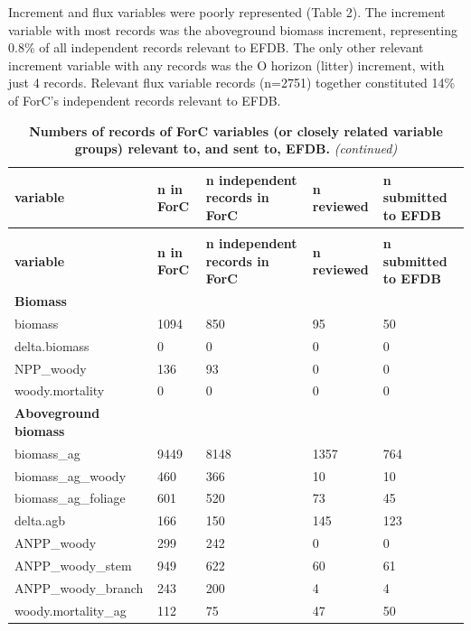 \documentclass[, manuscript]{copernicus}
\begin{document}
Increment and flux variables were poorly represented (Table 2). The
increment variable with most records was the aboveground biomass
increment, representing 0.8\% of all independent records relevant to
EFDB. The only other relevant increment variable with any records was
the O horizon (litter) increment, with just 4 records. Relevant flux
variable records (n=2751) together constituted 14\% of ForC's
independent records relevant to EFDB.

\newpage
\begingroup\fontsize{8}{10}\selectfont

\begin{longtable}[t]{l|l|l|l|l}
\caption{\label{tab:table_variables}\textbf{Numbers of records of ForC variables (or closely related variable groups) relevant to, and sent to, EFDB.}}\\
\hline
\textbf{variable} & \textbf{n in ForC} & \textbf{n independent records in ForC} & \textbf{n reviewed} & \textbf{n submitted to EFDB}\\
\hline
\endfirsthead
\caption[]{\textbf{Numbers of records of ForC variables (or closely related variable groups) relevant to, and sent to, EFDB.} \textit{(continued)}}\\
\hline
\textbf{variable} & \textbf{n in ForC} & \textbf{n independent records in ForC} & \textbf{n reviewed} & \textbf{n submitted to EFDB}\\
\hline
\endhead
\textbf{Biomass} & \textbf{} & \textbf{} & \textbf{} & \textbf{}\\
\hline
biomass & 1094 & 850 & 95 & 50\\
\hline
delta.biomass & 0 & 0 & 0 & 0\\
\hline
NPP\_woody & 136 & 93 & 0 & 0\\
\hline
woody.mortality & 0 & 0 & 0 & 0\\
\hline
\textbf{Aboveground biomass} & \textbf{} & \textbf{} & \textbf{} & \textbf{}\\
\hline
biomass\_ag & 9449 & 8148 & 1357 & 764\\
\hline
biomass\_ag\_woody & 460 & 366 & 10 & 10\\
\hline
biomass\_ag\_foliage & 601 & 520 & 73 & 45\\
\hline
delta.agb & 166 & 150 & 145 & 123\\
\hline
ANPP\_woody & 299 & 242 & 0 & 0\\
\hline
ANPP\_woody\_stem & 949 & 622 & 60 & 61\\
\hline
ANPP\_woody\_branch & 243 & 200 & 4 & 4\\
\hline
woody.mortality\_ag & 112 & 75 & 47 & 50\\

\end{longtable}
\end{document}
